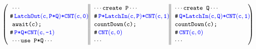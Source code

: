 
\begin{center}
  \begin{small}
 \\
 \\
\\\vspace{-12pt}
\[
\left(
\begin{tabular}{ 
  l@{\extracolsep{\fill}} || 
  l@{\extracolsep{\fill}} || 
  l@{\extracolsep{\fill}} }
\code{\dotonly{}} & \code{\dotsaying{create P}} & \code{\dotsaying{create Q}} \\
\!\!\code{\CSPEC{\!\!\LatchOut{c}{P{\sep}Q}{\sep}\CNT{c}{0}}}
&\code{\CSPEC{\!\!P{\sep}\LatchIn{c}{P}{\sep}\CNT{c}{1}}} 
& \code{\CSPEC{\!\!Q{\sep}\LatchIn{c}{Q}{\sep}\CNT{c}{1}}} \\
\code{await(c);} & \code{countDown(c);} & \code{countDown(c);}\\
\!\!\code{\CSPEC{\!\!{P{\sep}Q{\sep}\CNT{c}{-1}}}}
& \code{\CSPEC{\!\!\CNT{c}{0}}} 
& \code{\CSPEC{\!\!\CNT{c}{0}}} \\
\code{\dotsaying{use P*Q}} & \code{\dotonly{}} & \code{\dotonly{}} \\
\end{tabular}\!\!\right)%
\]

 \\
 \\
 \\

\end{small}
\end{center}
